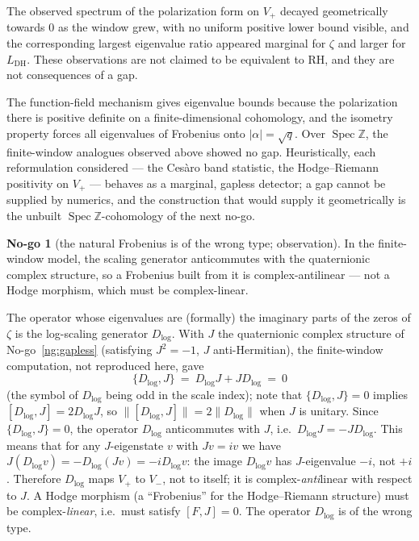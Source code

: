 \documentclass[11pt]{amsart}
\theoremstyle{definition}
\theoremstyle{remark}
\theoremstyle{definition}
\newtheorem{nogo}{No-go}[section]
\newcommand{\Spec}{\operatorname{Spec}}
\begin{document}
The observed spectrum of the polarization form on $V_+$ decayed geometrically towards $0$ as the window
grew, with no uniform positive lower bound visible, and the corresponding largest eigenvalue ratio
appeared marginal for $\zeta$ and larger for $L_{\mathrm{DH}}$. These observations are not claimed to be
equivalent to RH, and they are not consequences of a gap.

The function-field mechanism gives eigenvalue bounds because the polarization there is positive
definite on a finite-dimensional cohomology, and the isometry property forces all eigenvalues of
Frobenius onto $|\alpha|=\sqrt q$. Over $\Spec\mathbb Z$, the finite-window analogues observed above
showed no gap. Heuristically, each reformulation considered --- the Ces\`aro band statistic, the
Hodge--Riemann positivity on $V_+$ --- behaves as a marginal, gapless detector; a gap cannot be supplied by
numerics, and the construction that would supply it geometrically is the unbuilt $\Spec\mathbb
Z$-cohomology of the next no-go.

\begin{nogo}[the natural Frobenius is of the wrong type; observation]\label{ng:antilinear}
In the finite-window model, the scaling generator anticommutes with the quaternionic complex structure, so
a Frobenius built from it is complex-antilinear --- not a Hodge morphism, which must be complex-linear.
\end{nogo}
\noindent The operator whose eigenvalues are (formally) the imaginary parts of the zeros of $\zeta$ is the
log-scaling generator $D_{\log}$. With $J$ the quaternionic complex structure of No-go~\ref{ng:gapless}
(satisfying $J^2=-1$, $J$ anti-Hermitian), the finite-window computation, not reproduced here, gave
\[
   \{D_{\log},J\}\ =\ D_{\log}J+JD_{\log}\ =\ 0
\]
(the symbol of $D_{\log}$ being odd in the scale index); note that $\{D_{\log},J\}=0$ implies
$[D_{\log},J]=2D_{\log}J$, so $\|[D_{\log},J]\|=2\|D_{\log}\|$ when $J$ is unitary. Since $\{D_{\log},J\}=0$, the operator $D_{\log}$ anticommutes with $J$, i.e.\ $D_{\log}J=-JD_{\log}$. This
means that for any $J$-eigenstate $v$ with $Jv=iv$ we have $J(D_{\log}v)=-D_{\log}(Jv)=-iD_{\log}v$: the
image $D_{\log}v$ has $J$-eigenvalue $-i$, not $+i$. Therefore $D_{\log}$ maps $V_+$ to $V_-$, not to
itself; it is complex-\emph{anti}linear with respect to $J$. A Hodge morphism (a ``Frobenius'' for the
Hodge--Riemann structure) must be complex-\emph{linear}, i.e.\ must satisfy $[F,J]=0$. The operator
$D_{\log}$ is of the wrong type.
\end{document}
